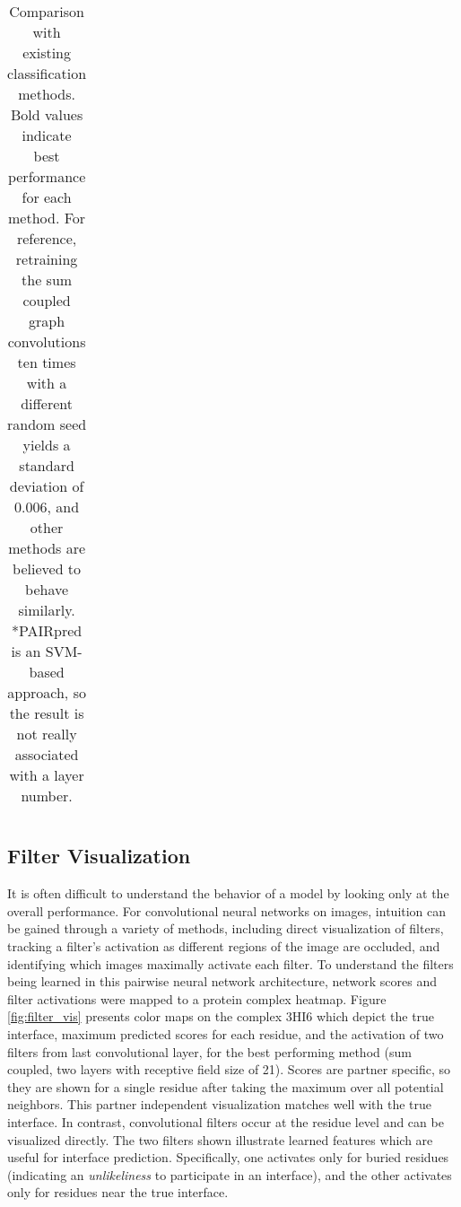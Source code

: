 \begin{table}
\begin{center}
\begin{tabular}{l c c c c c }
			\bottomrule
			
		\end{tabular}
		\caption{Comparison with existing classification methods. Bold values indicate best performance for each method. For reference, retraining the sum coupled graph convolutions ten times with a different random seed yields a standard deviation of 0.006, and other methods are believed to behave similarly. *PAIRpred is an SVM-based approach, so the result is not really associated with a layer number.}
		\label{tab:results_compare}
	\end{center}
\end{table}



\subsection{Filter Visualization}

It is often difficult to understand the behavior of a model by looking only at the overall performance. 
For convolutional neural networks on images, intuition can be gained through a variety of methods, including direct visualization of filters, tracking a filter's activation as different regions of the image are occluded, and identifying which images maximally activate each filter. 
To understand the filters being learned in this pairwise neural network architecture, network scores and filter activations were mapped to a protein complex heatmap.
Figure \ref{fig:filter_vis} presents color maps on the complex 3HI6 which depict the true interface, maximum predicted scores for each residue, and the activation of two filters from last convolutional layer, for the best performing method (sum coupled, two layers with receptive field size of 21).
Scores are partner specific, so they are shown for a single residue after taking the maximum over all potential neighbors.
This partner independent visualization matches well with the true interface.
In contrast, convolutional filters occur at the residue level and can be visualized directly. 
The two filters shown illustrate learned features which are useful for interface prediction.
Specifically, one activates only for buried residues (indicating an \emph{unlikeliness} to participate in an interface), and the other activates only for residues near the true interface.

